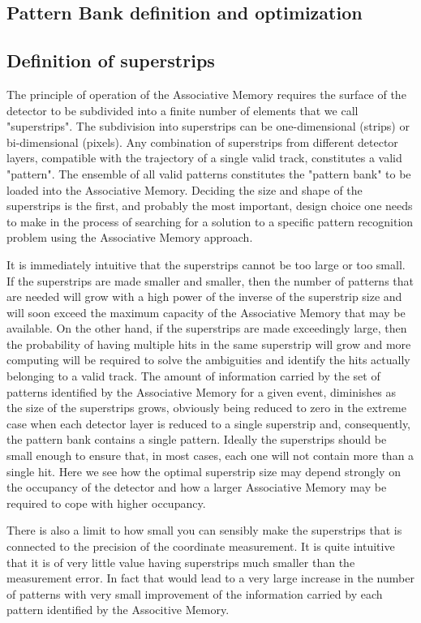 \subsection{Pattern Bank definition and optimization}

\subsection{Definition of superstrips}

	The principle of operation of the Associative Memory requires the surface of the detector to be subdivided into a finite number of elements that we call "superstrips".
	The subdivision into superstrips can be one-dimensional (strips) or bi-dimensional (pixels).
	Any combination of superstrips from different detector layers, compatible with the trajectory of a single valid track, constitutes a valid "pattern". The ensemble of all valid patterns constitutes the "pattern bank" to be loaded into the Associative Memory.
	Deciding the size and shape of the superstrips is the first, and probably the most important, design choice one needs to make in the process of searching for a solution to a specific pattern recognition problem using the Associative Memory approach.
	
	It is immediately intuitive that the superstrips cannot be too large or too small. If the superstrips are made smaller and smaller, then the number of patterns that are needed will grow with a high power of the inverse of the superstrip size and will soon exceed the maximum capacity of the Associative Memory that may be available. On the other hand, if the superstrips are made exceedingly large, then the probability of having multiple hits in the same superstrip will grow and more computing will be required to solve the ambiguities and identify the hits actually belonging to a valid track.
	The amount of information carried by the set of patterns identified by the Associative Memory for a given event, diminishes as the size of the superstrips grows, obviously being reduced to zero in the extreme case when each detector layer is reduced to a single superstrip and, consequently, the pattern bank contains a single pattern.
	Ideally the superstrips should be small enough to ensure that, in most cases, each one will not contain more than a single hit. Here we see how the optimal superstrip size may depend strongly on the occupancy of the detector and how a larger Associative Memory may be required to cope with higher occupancy.
	
	There is also a limit to how small you can sensibly make the superstrips that is connected to the precision of the coordinate measurement. It is quite intuitive that it is of very little value having superstrips much smaller than the measurement error. In fact that would lead to a very large increase in the number of patterns with very small improvement of the information carried by each pattern identified by the Associtive Memory.

